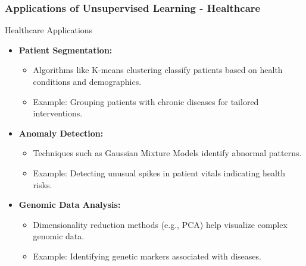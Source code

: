 \documentclass[aspectratio=169]{beamer}
\begin{document}
\begin{frame}[fragile]
    \frametitle{Applications of Unsupervised Learning - Healthcare}
    \begin{block}{Healthcare Applications}
        \begin{itemize}
            \item \textbf{Patient Segmentation:}
                \begin{itemize}
                    \item Algorithms like K-means clustering classify patients based on health conditions and demographics.
                    \item Example: Grouping patients with chronic diseases for tailored interventions.
                \end{itemize}
            \item \textbf{Anomaly Detection:}
                \begin{itemize}
                    \item Techniques such as Gaussian Mixture Models identify abnormal patterns.
                    \item Example: Detecting unusual spikes in patient vitals indicating health risks.
                \end{itemize}
            \item \textbf{Genomic Data Analysis:}
                \begin{itemize}
                    \item Dimensionality reduction methods (e.g., PCA) help visualize complex genomic data.
                    \item Example: Identifying genetic markers associated with diseases.
                \end{itemize}
        \end{itemize}
    \end{block}
\end{frame}
\end{document}

